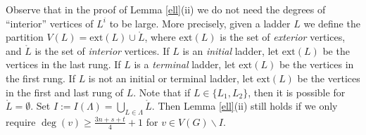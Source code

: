 \documentclass[oneside,12pt]{memoir}
\newcommand{\ssm}{\smallsetminus}
\newcommand{\ext}{\mathrm{ext}}
\begin{document}
Observe that in the proof of Lemma \ref{ell}(ii) we do not need the degrees of ``interior'' vertices of $L^i$ to be large. More precisely, given a ladder $L$ we define the partition $V(L)=\ext(L)\cup \mathring{L}$, where $\ext(L)$ is the set of \emph{exterior} vertices, and $\mathring{L}$ is the set of \emph{interior} vertices.  If $L$ is an \emph{initial} ladder, let $\ext(L)$ be the vertices in the last rung.  If $L$ is a \emph{terminal} ladder, let $\mathrm{ext}(L)$ be the vertices in the first rung.  If $L$ is not an initial or terminal ladder, let $\mathrm{ext}(L)$ be the vertices in the first and last rung of $L$.
Note that if $L\in\{L_1,L_2\}$, then it is possible for $\mathring{L}=\emptyset$. Set $I:=I(\Lambda)=\bigcup_{L\in \Lambda}\mathring{L}$. Then Lemma \ref{ell}(ii) still holds if we only require $\deg(v)\ge \frac{3n+s+t}{4}+1$ for $v\in V(G)\smallsetminus I$.
\end{document}

